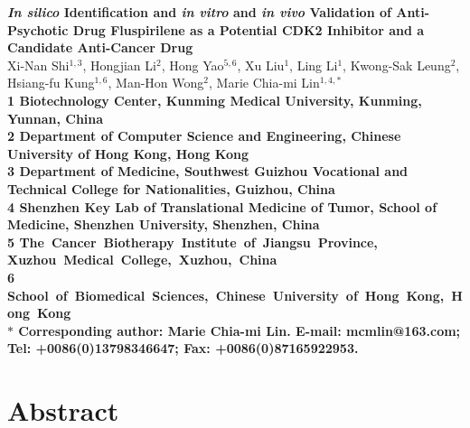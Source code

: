 \documentclass[10pt]{article}
\date{}
\begin{document}
\begin{flushleft}
{\Large
\textbf{\textit{In silico} Identification and \textit{in vitro} and \textit{in vivo} Validation of Anti-Psychotic Drug Fluspirilene as a Potential CDK2 Inhibitor and a Candidate Anti-Cancer Drug}
}
\\
Xi-Nan Shi$^{1,3}$,%
Hongjian Li$^{2}$,%
Hong Yao$^{5,6}$,%
Xu Liu$^{1}$,%
Ling Li$^{1}$,%
Kwong-Sak Leung$^{2}$,%
Hsiang-fu Kung$^{1,6}$,%
Man-Hon Wong$^{2}$,%
Marie Chia-mi Lin$^{1,4,\ast}$%
\\
\bf{1} Biotechnology Center, Kunming Medical University, Kunming, Yunnan, China\\
\bf{2} Department of Computer Science and Engineering, Chinese University of Hong Kong, Hong Kong\\
\bf{3} Department of Medicine, Southwest Guizhou Vocational and Technical College for Nationalities, Guizhou, China\\
\bf{4} Shenzhen Key Lab of Translational Medicine of Tumor, School of Medicine, Shenzhen University, Shenzhen, China\\
\bf{5} The Cancer Biotherapy Institute of Jiangsu Province, Xuzhou Medical College, Xuzhou, China\\
\bf{6} School of Biomedical Sciences, Chinese University of Hong Kong, Hong Kong\\
$\ast$ Corresponding author: Marie Chia-mi Lin. E-mail: mcmlin@163.com; Tel: +0086(0)13798346647; Fax: +0086(0)87165922953.
\end{flushleft}

\section*{Abstract}
\end{document}
